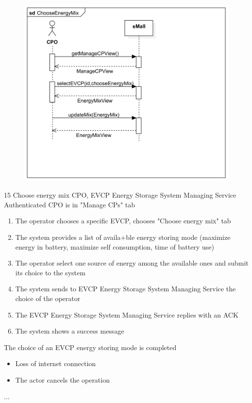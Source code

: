 \usecase
{
    \begin{figure}[H]
        \centering
        \includegraphics[scale=0.9]{src/sequence_diagram/chooseEnergyMix.png}
    \end{figure}
}
{15}
{Choose energy mix} %
{CPO, EVCP Energy Storage System Managing Service} %
{Authenticated CPO is in "Manage CPs" tab} %
{ %
    \begin{enumerate}
        \item The operator chooses a specific EVCP, chooses "Choose energy mix" tab
        \item The system provides a list of availa+ble energy storing mode (maximize energy in battery, maximize self consumption, time of battery use)
        \item The operator select one source of energy among the available ones and submit its choice to the system
        \item The system sends to EVCP Energy Storage System Managing Service the choice of the operator
        \item The EVCP Energy Storage System Managing Service replies with an ACK
        \item The system shows a success message
    \end{enumerate}
}
{The choice of an EVCP energy storing mode is completed} %
{ %
    \begin{itemize}
        \item Loss of internet connection
        \item The actor cancels the operation
    \end{itemize}
}
{ %
    ...
}

